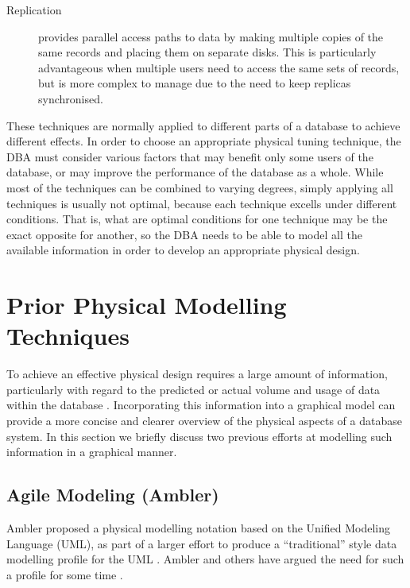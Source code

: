 \documentclass{llncs}
\begin{document}
\begin{description}
	\item[Replication] provides parallel access paths to data by making
	multiple copies of the same records and placing them on separate
	disks. This is particularly advantageous when multiple users need to
	access the same sets of records, but is more complex to manage due
	to the need to keep replicas synchronised.


\end{description}

These techniques are normally applied to different parts of a database
to achieve different effects. In order to choose an appropriate physical
tuning technique, the DBA must consider various factors that may benefit
only some users of the database, or may improve the performance of the
database as a whole. While most of the techniques can be combined to
varying degrees, simply applying all techniques is usually not optimal,
because each technique excells under different conditions. That is, what
are optimal conditions for one technique may be the exact opposite for
another, so the DBA needs to be able to model all the available
information in order to develop an appropriate physical design.



\section{Prior Physical Modelling Techniques}
\label{sec-previous}

To achieve an effective physical design requires a large amount of
information, particularly with regard to the predicted or actual volume
and usage of data within the database \cite{BeDa-P-2003}. Incorporating
this information into a graphical model can provide a more concise and
clearer overview of the physical aspects of a database system. In this
section we briefly discuss two previous efforts at modelling such
information in a graphical manner.


\subsection{Agile Modeling (Ambler)}

Ambler proposed a physical modelling notation based on the Unified
Modeling Language (UML), as part of a larger effort to produce a
``traditional'' style data modelling profile for the UML
\cite{Ambl-SW-2003-ADT,Ambl-SW-2004-ObjPrimer3}. Ambler and others have
argued the need for such a profile for some time
\cite{Ambl-SW-1998-BOA,Naib-EJ-2001-UMLDD}.
\end{document}
